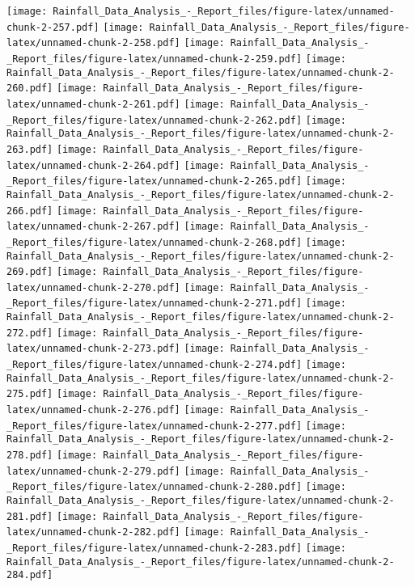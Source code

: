 \documentclass[
]{article}
\begin{document}
\texttt{[image: Rainfall\_Data\_Analysis\_-\_Report\_files/figure-latex/unnamed-chunk-2-257.pdf]}
\texttt{[image: Rainfall\_Data\_Analysis\_-\_Report\_files/figure-latex/unnamed-chunk-2-258.pdf]}
\texttt{[image: Rainfall\_Data\_Analysis\_-\_Report\_files/figure-latex/unnamed-chunk-2-259.pdf]}
\texttt{[image: Rainfall\_Data\_Analysis\_-\_Report\_files/figure-latex/unnamed-chunk-2-260.pdf]}
\texttt{[image: Rainfall\_Data\_Analysis\_-\_Report\_files/figure-latex/unnamed-chunk-2-261.pdf]}
\texttt{[image: Rainfall\_Data\_Analysis\_-\_Report\_files/figure-latex/unnamed-chunk-2-262.pdf]}
\texttt{[image: Rainfall\_Data\_Analysis\_-\_Report\_files/figure-latex/unnamed-chunk-2-263.pdf]}
\texttt{[image: Rainfall\_Data\_Analysis\_-\_Report\_files/figure-latex/unnamed-chunk-2-264.pdf]}
\texttt{[image: Rainfall\_Data\_Analysis\_-\_Report\_files/figure-latex/unnamed-chunk-2-265.pdf]}
\texttt{[image: Rainfall\_Data\_Analysis\_-\_Report\_files/figure-latex/unnamed-chunk-2-266.pdf]}
\texttt{[image: Rainfall\_Data\_Analysis\_-\_Report\_files/figure-latex/unnamed-chunk-2-267.pdf]}
\texttt{[image: Rainfall\_Data\_Analysis\_-\_Report\_files/figure-latex/unnamed-chunk-2-268.pdf]}
\texttt{[image: Rainfall\_Data\_Analysis\_-\_Report\_files/figure-latex/unnamed-chunk-2-269.pdf]}
\texttt{[image: Rainfall\_Data\_Analysis\_-\_Report\_files/figure-latex/unnamed-chunk-2-270.pdf]}
\texttt{[image: Rainfall\_Data\_Analysis\_-\_Report\_files/figure-latex/unnamed-chunk-2-271.pdf]}
\texttt{[image: Rainfall\_Data\_Analysis\_-\_Report\_files/figure-latex/unnamed-chunk-2-272.pdf]}
\texttt{[image: Rainfall\_Data\_Analysis\_-\_Report\_files/figure-latex/unnamed-chunk-2-273.pdf]}
\texttt{[image: Rainfall\_Data\_Analysis\_-\_Report\_files/figure-latex/unnamed-chunk-2-274.pdf]}
\texttt{[image: Rainfall\_Data\_Analysis\_-\_Report\_files/figure-latex/unnamed-chunk-2-275.pdf]}
\texttt{[image: Rainfall\_Data\_Analysis\_-\_Report\_files/figure-latex/unnamed-chunk-2-276.pdf]}
\texttt{[image: Rainfall\_Data\_Analysis\_-\_Report\_files/figure-latex/unnamed-chunk-2-277.pdf]}
\texttt{[image: Rainfall\_Data\_Analysis\_-\_Report\_files/figure-latex/unnamed-chunk-2-278.pdf]}
\texttt{[image: Rainfall\_Data\_Analysis\_-\_Report\_files/figure-latex/unnamed-chunk-2-279.pdf]}
\texttt{[image: Rainfall\_Data\_Analysis\_-\_Report\_files/figure-latex/unnamed-chunk-2-280.pdf]}
\texttt{[image: Rainfall\_Data\_Analysis\_-\_Report\_files/figure-latex/unnamed-chunk-2-281.pdf]}
\texttt{[image: Rainfall\_Data\_Analysis\_-\_Report\_files/figure-latex/unnamed-chunk-2-282.pdf]}
\texttt{[image: Rainfall\_Data\_Analysis\_-\_Report\_files/figure-latex/unnamed-chunk-2-283.pdf]}
\texttt{[image: Rainfall\_Data\_Analysis\_-\_Report\_files/figure-latex/unnamed-chunk-2-284.pdf]}
\end{document}
